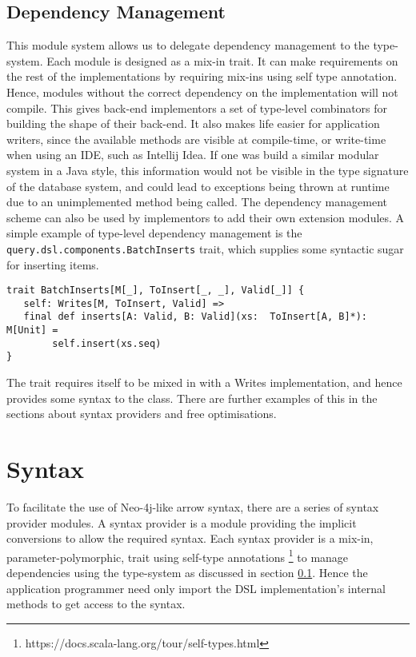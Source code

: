 \documentclass{report}
\newcommand \2[0]{\textbf{2}}
\newcommand \3[0]{\textbf{3}}
\begin{document}
\subsection{Dependency Management}\label{depManagement}
This module system allows us to delegate dependency management to the type-system. Each module is designed as a mix-in trait. It can make requirements on the rest of the implementations by requiring mix-ins using self type annotation. Hence, modules without the correct dependency on the implementation will not compile. This gives back-end implementors a set of type-level combinators for building the shape of their back-end. It also makes life easier for application writers, since the available methods are visible at compile-time, or write-time when using an IDE, such as Intellij Idea. If one was build a similar modular system in a Java style, this information would not be visible in the type signature of the database system, and could lead to exceptions being thrown at runtime due to an unimplemented method being called. The dependency management scheme can also be used by implementors to add their own extension modules. A simple example of type-level dependency management is the \texttt{query.dsl.components.BatchInserts} trait, which supplies some syntactic sugar for inserting items.

\begin{verbatim}
trait BatchInserts[M[_], ToInsert[_, _], Valid[_]] {
   self: Writes[M, ToInsert, Valid] =>
   final def inserts[A: Valid, B: Valid](xs:  ToInsert[A, B]*): M[Unit] =
        self.insert(xs.seq)
}
\end{verbatim}


The trait requires itself to be mixed in with a Writes implementation, and hence provides some syntax to the class. There are further examples of this in the sections about syntax providers and free optimisations.

\section{Syntax}
To facilitate the use of Neo-4j-like arrow syntax, there are a series of syntax provider modules. A syntax provider is a module providing the implicit conversions to allow the required syntax. Each syntax provider is a mix-in, parameter-polymorphic, trait using self-type annotations \footnote{https://docs.scala-lang.org/tour/self-types.html} to manage dependencies using the type-system as discussed in section \ref{depManagement}. Hence the application programmer need only import the DSL implementation's internal methods to get access to the syntax.
\end{document}
